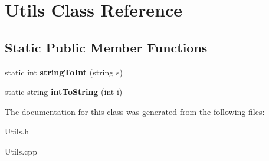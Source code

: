 \hypertarget{classUtils}{\section{\-Utils \-Class \-Reference}
\label{classUtils}
}
\subsection*{\-Static \-Public \-Member \-Functions}
\begin{DoxyCompactItemize}
\item 
\hypertarget{classUtils_aadddf97055262d0f250503deb8348e69}{static int {\bfseries string\-To\-Int} (string s)}\label{classUtils_aadddf97055262d0f250503deb8348e69}

\item 
\hypertarget{classUtils_a12fe6e7e6d451ff26388b99a85b21ed0}{static string {\bfseries int\-To\-String} (int i)}\label{classUtils_a12fe6e7e6d451ff26388b99a85b21ed0}

\end{DoxyCompactItemize}


\-The documentation for this class was generated from the following files\-:\begin{DoxyCompactItemize}
\item 
\-Utils.\-h\item 
\-Utils.\-cpp\end{DoxyCompactItemize}
